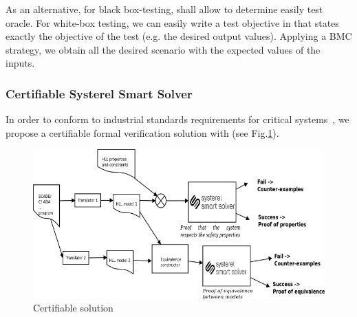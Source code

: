 As an alternative, for black box-testing, \smartsolver{} shall allow to determine easily test oracle.
For white-box testing, we can easily write a test objective in \HLL{} that
states exactly the objective of the test (e.g. the desired output values). Applying a BMC strategy, we obtain all the desired scenario with the expected values of the inputs.


\subsubsection{Certifiable Systerel Smart Solver}
\label{cs3}

In order to conform to industrial standards  requirements for critical systems~\cite{standard_railway_2011,standard_aerospace_2011}, we propose a certifiable formal verification solution with  \smartsolver{} (see Fig.\ref{fig:s3-certif-check}).


\begin{figure}[h]
  \centering
  \includegraphics[width=1\textwidth]{figures/s3certif}
  \caption{Certifiable solution}
  \label{fig:s3-certif-check}
\end{figure}

